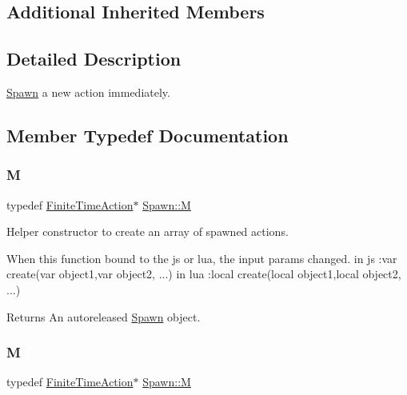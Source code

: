 \subsection*{Additional Inherited Members}


\subsection{Detailed Description}
\hyperlink{classSpawn}{Spawn} a new action immediately. 

\subsection{Member Typedef Documentation}
\mbox{\label{classSpawn_a3b3334ea4e6fe3664be6cbea9743db88}} 
\subsubsection{\texorpdfstring{M}{M}\hspace{0.1cm}{\footnotesize\ttfamily [1/2]}}
{\footnotesize\ttfamily typedef \hyperlink{classFiniteTimeAction}{Finite\+Time\+Action}$\ast$ \hyperlink{classSpawn_a3b3334ea4e6fe3664be6cbea9743db88}{Spawn\+::M}}

Helper constructor to create an array of spawned actions. 
\begin{DoxyCode}
When \textcolor{keyword}{this} \textcolor{keyword}{function} bound to the js or lua, the input params changed.
in js  :var   create(var   object1,var   object2, ...)
in lua :local create(local object1,local object2, ...)
\end{DoxyCode}


\begin{DoxyReturn}{Returns}
An autoreleased \hyperlink{classSpawn}{Spawn} object. 
\end{DoxyReturn}
\mbox{\label{classSpawn_a3b3334ea4e6fe3664be6cbea9743db88}} 
\subsubsection{\texorpdfstring{M}{M}\hspace{0.1cm}{\footnotesize\ttfamily [2/2]}}
{\footnotesize\ttfamily typedef \hyperlink{classFiniteTimeAction}{Finite\+Time\+Action}$\ast$ \hyperlink{classSpawn_a3b3334ea4e6fe3664be6cbea9743db88}{Spawn\+::M}}

